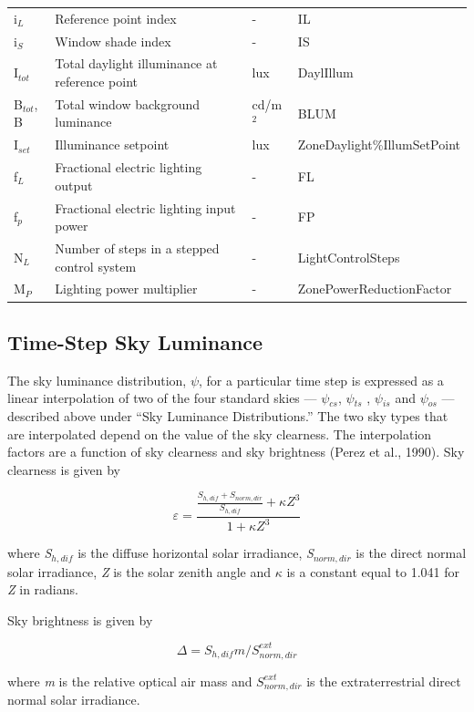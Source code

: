 \begin{longtable}[c]{p{1.0in}p{2.0in}p{1.0in}p{2.0in}}
i\(_{L}\) & Reference point index & - & IL \tabularnewline
i\(_{S}\) & Window shade index & - & IS \tabularnewline
I\(_{tot}\) & Total daylight illuminance at reference point & lux & DaylIllum \tabularnewline
B\(_{tot}\), B & Total window background luminance & cd/m\(^{2}\) & BLUM \tabularnewline
I\(_{set}\) & Illuminance setpoint & lux & ZoneDaylight\%IllumSetPoint \tabularnewline
f\(_{L}\) & Fractional electric lighting output & - & FL \tabularnewline
f\(_{p}\) & Fractional electric lighting input power & - & FP \tabularnewline
N\(_{L}\) & Number of steps in a stepped control system & - & LightControlSteps \tabularnewline
M\(_{P}\) & Lighting power multiplier & - & ZonePowerReductionFactor \tabularnewline
\bottomrule
\end{longtable}

\subsection{Time-Step Sky Luminance}\label{time-step-sky-luminance}

The sky luminance distribution, \emph{$\psi$}, for a particular time step is expressed as a linear interpolation of two of the four standard skies --- \emph{$\psi$\(_{cs}\)}, \emph{$\psi$\(_{ts}\)} , \emph{$\psi$\(_{is}\)} and \emph{$\psi$\(_{os}\)} --- described above under ``Sky Luminance Distributions.'' The two sky types that are interpolated depend on the value of the sky clearness. The interpolation factors are a function of sky clearness and sky brightness (Perez et al., 1990). Sky clearness is given by

\begin{equation}
\varepsilon  = \frac{{\frac{{{S_{h,dif}} + {S_{norm,dir}}}}{{{S_{h,dif}}}} + \kappa {Z^3}}}{{1 + \kappa {Z^3}}}
\end{equation}

where \emph{S\(_{h,dif}\)} is the diffuse horizontal solar irradiance, \emph{S\(_{norm,dir}\)} is the direct normal solar irradiance, \emph{Z} is the solar zenith angle and \emph{$\kappa$} is a constant equal to 1.041 for \emph{Z} in radians.

Sky brightness is given by

\begin{equation}
\Delta  = {S_{h,dif}}m/S_{norm,dir}^{ext}
\end{equation}

where \emph{m} is the relative optical air mass and \(S_{norm,dir}^{ext}\) is the extraterrestrial direct normal solar irradiance.

